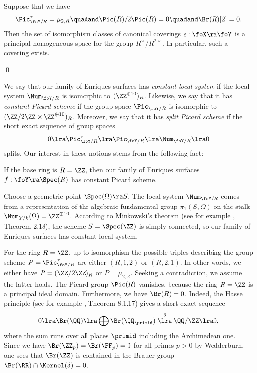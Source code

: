 \begin{proposition}
\notready
Suppose that we have
$$
\Pic^\tau_{\foY/R}=\mu_{2,R}\quadand \Pic(R)/2\Pic(R)=0\quadand   \Br(R)[2]=0.
$$
Then  the set of isomorphism classes
of canonical coverings $\epsilon:\foX\ra\foY$ is a principal homogeneous space for the group $R^\times/R^{2\times}$.
In particular, such a covering exists.
\end{proposition}

\proof
\qed
\fi


We say that our family of Enriques surfaces has \emph{constant local system} if
the local system $\Num_{\foY/R} $ is isomorphic  to
$(\ZZ^{\oplus 10})_R$. Likewise, we say that it has \emph{constant Picard scheme} if
the group space $\Pic_{\foY/R}$ is isomorphic to $(\ZZ/2\ZZ\times\ZZ^{\oplus 10})_R$.
Moreover, we say that it has \emph{split Picard scheme} if the short exact sequence of group spaces
\begin{equation}
0\lra \Pic^\tau_{\foY/R}\lra \Pic_{\foY/R}\lra \Num_{\foY/R}\lra 0
\end{equation}
splits. Our interest in these notions stems from the following fact:

\begin{proposition}
\notready
\label{constant picard scheme}
If the base ring is $R=\ZZ$, then our family of Enriques surfaces $f:\foY\ra\Spec(R)$ has constant Picard scheme.
\end{proposition}

\proof
Choose  a geometric point $\Spec(\Omega)\ra S$.
The local system $\Num_{\foY/R}$ comes from a representation of the algebraic fundamental group
$\pi_1(S,\Omega)$ on the stalk $\Num_{Y/k}(\Omega)=\ZZ^{\oplus 10}$. According to Minkowski's theorem
(see for example \cite{Neukirch-1999}, Theorem 2.18), the scheme $S=\Spec(\ZZ)$
is simply-connected, so our family of Enriques surfaces has constant local system.

For the ring $R=\ZZ$, up to isomorphism the possible triples describing the group scheme $P=\Pic^\tau_{\foY/R}$
are either $(R,1,2)$ or $(R,2,1)$. In other words, we either have $P=(\ZZ/2\ZZ)_R$ or $P=\mu_{2,R}$.
Seeking a contradiction, we assume the latter holds.
The Picard group $\Pic(R)$ vanishes, because the ring  $R=\ZZ$ is a principal ideal domain.
Furthermore, we have $\Br(R)=0$. Indeed, the Hasse principle (see for example \cite{Neukirch-Schmidt-Wingberg-2008}, Theorem 8.1.17)
gives a short exact sequence
$$
0\lra\Br(\QQ)\lra \bigoplus\Br(\QQ_\primid)\stackrel{\delta}{\lra} \QQ/\ZZ\lra 0,
$$
where the sum runs over all places $\primid$ including the Archimedean one. Since we have $\Br(\ZZ_p)=\Br(\FF_p)=0$ for all primes $p>0$ by Wedderburn,
one sees that $\Br(\ZZ)$ is contained in the Brauer group $\Br(\RR)\cap\Kernel(\delta)=0$.

